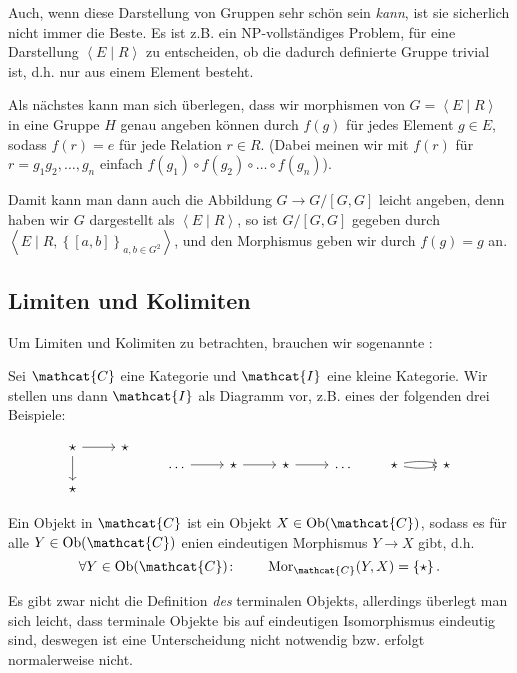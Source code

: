 \begin{remark*}
\Warning    Auch, wenn diese Darstellung von Gruppen sehr schön sein \textit{kann}, ist sie sicherlich nicht immer die Beste. Es ist z.B. ein NP-vollständiges Problem, für eine Darstellung $\left< E \mid  R \right> $ zu entscheiden, ob die dadurch definierte Gruppe trivial ist, d.h. nur aus einem Element besteht.
\end{remark*}
\begin{recap}
    Als nächstes kann man sich überlegen, dass wir morphismen von $G = \left< E \mid  R \right> $ in eine Gruppe $H$ genau angeben können durch  $f(g)$ für jedes Element  $g\in E$, sodass $f(r) = e$ für jede Relation  $r\in R$. (Dabei meinen wir mit $f(r)$ für  $r = g_1g_2,\ldots,g_n$ einfach $f(g_1)\circ f(g_2)\circ \ldots\circ f(g_n)$). 

    Damit kann man dann auch die Abbildung $G \to  G / [G,G]$ leicht angeben, denn haben wir $G$ dargestellt als  $\left< E \mid  R \right> $, so ist $G / [G,G]$ gegeben durch  $\left< E \mid R, \left \{[a,b]\right\} _{a,b\in G^2} \right> $, und den Morphismus geben wir durch $f(g) = g$ an.
\end{recap}

\subsection{Limiten und Kolimiten}
Um Limiten und Kolimiten zu betrachten, brauchen wir sogenannte :

Sei $\mathcat{C}$ eine Kategorie und $\mathcat{I}$ eine kleine Kategorie. Wir stellen uns dann $\mathcat{I}$ als Diagramm vor, z.B. eines der folgenden drei Beispiele:

\begin{equation}
\begin{tikzcd}
    \star \ar{r} \ar{d} & \star \\
    \star
\end{tikzcd} 
\qquad
\begin{tikzcd}
    \ldots \ar{r} & \star \ar{r} & \star \ar{r} &\ldots
\end{tikzcd}
\qquad
\begin{tikzcd}
    \star \ar[bend left = 10]{r} \ar[bend right = 10]{r} & \star
\end{tikzcd}
\label{eq:diagramme}
\end{equation}

\begin{definition}
    Ein  Objekt in $\mathcat{C}$ ist ein Objekt $X\in \Ob(\mathcat{C})$, sodass es für alle $Y\in \Ob(\mathcat{C})$ enien eindeutigen Morphismus $Y \to  X$ gibt, d.h.
     \[
         \forall Y\in \Ob(\mathcat{C})\colon  \qquad \Mor_{\mathcat{C}}(Y,X) = \left \{\star\right\} 
    .\] 
\end{definition}
\begin{oral}
    Es gibt zwar nicht die Definition \textit{des} terminalen Objekts, allerdings überlegt man sich leicht, dass terminale Objekte bis auf eindeutigen Isomorphismus eindeutig sind, deswegen ist eine Unterscheidung nicht notwendig bzw. erfolgt normalerweise nicht.
\end{oral}

